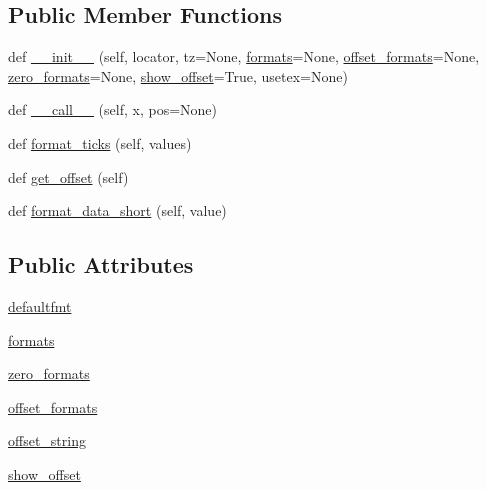 \subsection*{Public Member Functions}
\begin{DoxyCompactItemize}
\item 
def \hyperlink{classmatplotlib_1_1dates_1_1ConciseDateFormatter_adb5b715bcae62cfa81c66975a3144351}{\+\_\+\+\_\+init\+\_\+\+\_\+} (self, locator, tz=None, \hyperlink{classmatplotlib_1_1dates_1_1ConciseDateFormatter_abd44e4b13413f87fa5f08805087ac6ee}{formats}=None, \hyperlink{classmatplotlib_1_1dates_1_1ConciseDateFormatter_ad9e5e3d113020240d3da5cb6be4cbb27}{offset\+\_\+formats}=None, \hyperlink{classmatplotlib_1_1dates_1_1ConciseDateFormatter_a51143b34a781033e2956bfa1c964bd24}{zero\+\_\+formats}=None, \hyperlink{classmatplotlib_1_1dates_1_1ConciseDateFormatter_a39b357d4510dca33a53a696c2b42ee9b}{show\+\_\+offset}=True, usetex=None)
\item 
def \hyperlink{classmatplotlib_1_1dates_1_1ConciseDateFormatter_ae1db09ba04fd86bc5fe74f76dbd62501}{\+\_\+\+\_\+call\+\_\+\+\_\+} (self, x, pos=None)
\item 
def \hyperlink{classmatplotlib_1_1dates_1_1ConciseDateFormatter_a9458546a09f65ac36fb3876f535579e8}{format\+\_\+ticks} (self, values)
\item 
def \hyperlink{classmatplotlib_1_1dates_1_1ConciseDateFormatter_ac75e88571909ae53fd696459834f84f7}{get\+\_\+offset} (self)
\item 
def \hyperlink{classmatplotlib_1_1dates_1_1ConciseDateFormatter_a0db87572f53aa1783bd4dfa2e0c7e9df}{format\+\_\+data\+\_\+short} (self, value)
\end{DoxyCompactItemize}
\subsection*{Public Attributes}
\begin{DoxyCompactItemize}
\item 
\hyperlink{classmatplotlib_1_1dates_1_1ConciseDateFormatter_a45d828e4aa6ea8a57a821eb4a659aa39}{defaultfmt}
\item 
\hyperlink{classmatplotlib_1_1dates_1_1ConciseDateFormatter_abd44e4b13413f87fa5f08805087ac6ee}{formats}
\item 
\hyperlink{classmatplotlib_1_1dates_1_1ConciseDateFormatter_a51143b34a781033e2956bfa1c964bd24}{zero\+\_\+formats}
\item 
\hyperlink{classmatplotlib_1_1dates_1_1ConciseDateFormatter_ad9e5e3d113020240d3da5cb6be4cbb27}{offset\+\_\+formats}
\item 
\hyperlink{classmatplotlib_1_1dates_1_1ConciseDateFormatter_a1a607db02a07c9b06d42e4f953187f01}{offset\+\_\+string}
\item 
\hyperlink{classmatplotlib_1_1dates_1_1ConciseDateFormatter_a39b357d4510dca33a53a696c2b42ee9b}{show\+\_\+offset}
\end{DoxyCompactItemize}
